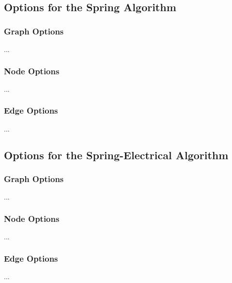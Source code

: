 \subsection{Options for the Spring Algorithm}

\subsubsection{Graph Options}

...

\subsubsection{Node Options}

...

\subsubsection{Edge Options}

...

\subsection{Options for the Spring-Electrical Algorithm}

\subsubsection{Graph Options}

...

\subsubsection{Node Options}

...

\subsubsection{Edge Options}

...

\endinput

